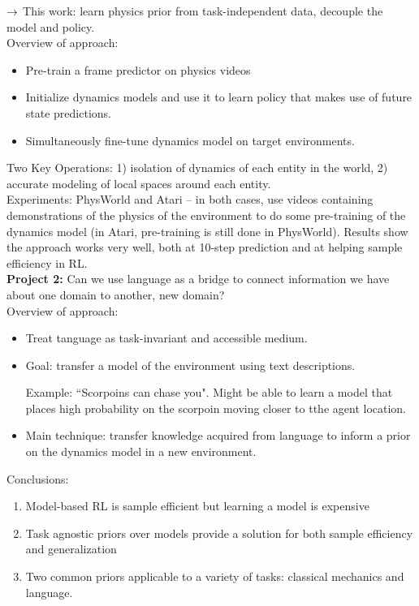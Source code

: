 $\rightarrow$ This work: learn physics prior from task-independent data, decouple the model and policy. \\


Overview of approach:
\begin{itemize}
    \item Pre-train a frame predictor on physics videos
    \item Initialize dynamics models and use it to learn policy that makes use of future state predictions.
    \item Simultaneously fine-tune dynamics model on target environments.
\end{itemize}
Two Key Operations: 1) isolation of dynamics of each entity in the world, 2) accurate modeling of local spaces around each entity. \\

Experiments: PhysWorld and Atari -- in both cases, use videos containing demonstrations of the physics of the environment to do some pre-training of the dynamics model (in Atari, pre-training is still done in PhysWorld). Results show the approach works very well, both at 10-step prediction and at helping sample efficiency in RL. \\


{\bf Project 2:} Can we use language as a bridge to connect information we have about one domain to another, new domain? \\

Overview of approach:
\begin{itemize}
    \item Treat tanguage as task-invariant and accessible medium.
    \item Goal: transfer a model of the environment using text descriptions.
    
    Example: ``Scorpoins can chase you". Might be able to learn a model that places high probability on the scorpoin moving closer to tthe agent location.
    
    \item Main technique: transfer knowledge acquired from language to inform a prior on the dynamics model in a new environment.
\end{itemize}


Conclusions:
\begin{enumerate}
    \item Model-based RL is sample efficient but learning a model is expensive
    \item Task agnostic priors over models provide a solution for both sample efficiency and generalization
    \item Two common priors applicable to a variety of tasks: classical mechanics and language.
\end{enumerate}


